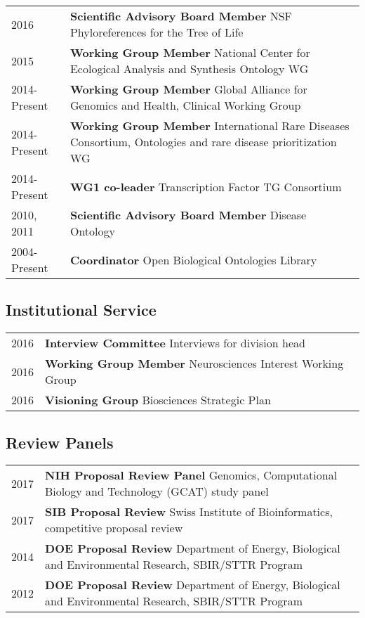 \documentclass[11pt,fullpage]{article}
\begin{document}
\begin{longtable}{p{0.5in}|p{5.5in}}

  2016  & \textbf{Scientific Advisory Board Member} NSF Phyloreferences for the Tree of Life \\
  2015  & \textbf{Working Group Member}  National Center for Ecological Analysis and Synthesis Ontology WG \\
  2014-Present  & \textbf{Working Group Member}  Global Alliance for Genomics and Health, Clinical Working Group \\
  2014-Present  & \textbf{Working Group Member}  International Rare Diseases Consortium, Ontologies and rare disease prioritization WG \\
  2014-Present  & \textbf{WG1 co-leader} Transcription Factor TG Consortium \\
  2010, 2011 & \textbf{Scientific Advisory Board Member} Disease Ontology \\
  2004-Present  & \textbf{Coordinator} Open Biological Ontologies Library \\

\end{longtable}

\subsection*{Institutional Service}

\begin{longtable}{p{0.5in}|p{5.5in}}

  2016 & \textbf{Interview Committee} Interviews for division head \\
  2016 & \textbf{Working Group Member} Neurosciences Interest Working Group \\
  2016 & \textbf{Visioning Group} Biosciences Strategic Plan \\

\end{longtable}

\subsection*{Review Panels}

\begin{longtable}{p{0.5in}|p{5.5in}}

  2017 & \textbf{NIH Proposal Review Panel} Genomics, Computational Biology and Technology (GCAT) study panel \\
  2017 & \textbf{SIB Proposal Review} Swiss Institute of Bioinformatics, competitive proposal review \\
  2014 & \textbf{DOE Proposal Review} Department of Energy, Biological and Environmental Research, SBIR/STTR Program \\
  2012 & \textbf{DOE Proposal Review} Department of Energy, Biological and Environmental Research, SBIR/STTR Program \\

\end{longtable}
\end{document}
